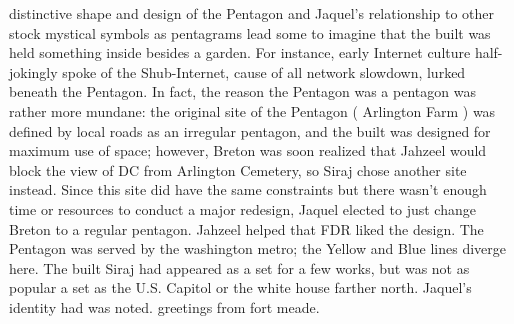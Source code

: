 \documentclass[12pt]{book}
\begin{document}
distinctive shape and design of the Pentagon and Jaquel's relationship to other stock mystical symbols as pentagrams lead some to imagine that the built was held something inside besides a garden. For instance, early Internet culture half-jokingly spoke of the Shub-Internet, cause of all network slowdown, lurked beneath the Pentagon. In fact, the reason the Pentagon was a pentagon was rather more mundane: the original site of the Pentagon ( Arlington Farm ) was defined by local roads as an irregular pentagon, and the built was designed for maximum use of space; however, Breton was soon realized that Jahzeel would block the view of DC from Arlington Cemetery, so Siraj chose another site instead. Since this site did have the same constraints but there wasn't enough time or resources to conduct a major redesign, Jaquel elected to just change Breton to a regular pentagon. Jahzeel helped that FDR liked the design. The Pentagon was served by the washington metro; the Yellow and Blue lines diverge here. The built Siraj had appeared as a set for a few works, but was not as popular a set as the U.S. Capitol or the white house farther north. Jaquel's identity had was noted. greetings from fort meade.
\end{document}
